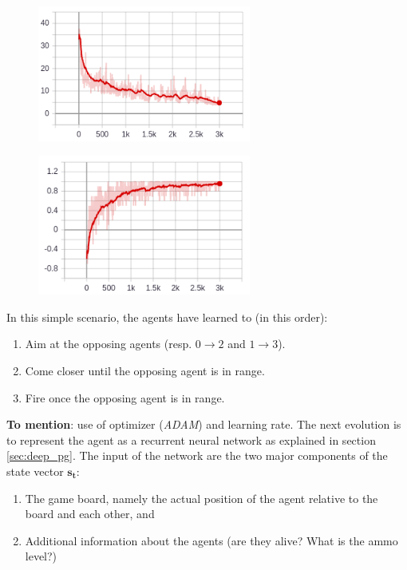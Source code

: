 \begin{figure}
\centering
\begin{minipage}{.5\textwidth}
  \centering
  \includegraphics[width=7cm]{images/experiment1/mean_length.png}
  \label{fig:exp1_length}
\end{minipage}%
\begin{minipage}{.5\textwidth}
  \centering
  \includegraphics[width=7cm]{images/experiment1/mean_reward.png}
  \label{fig:exp1_reward}
\end{minipage}
\end{figure}
In this simple scenario, the agents have learned to (in this order):
\begin{enumerate}
    \item Aim at the opposing agents (resp. $0 \rightarrow 2$ and $1 \rightarrow 3$).
    \item Come closer until the opposing agent is in range.
    \item Fire once the opposing agent is in range.
\end{enumerate}
\textbf{To mention}: use of optimizer (\emph{ADAM}) and learning rate.
The next evolution is to represent the agent as a recurrent neural network as explained in section \ref{sec:deep_pg}. The input of the network are the two major components of the state vector $\bm{s_t}$:
\begin{enumerate}
    \item The game board, namely the actual position of the agent relative to the board and each other, and
    \item Additional information about the agents (are they alive? What is the ammo level?)
\end{enumerate}
